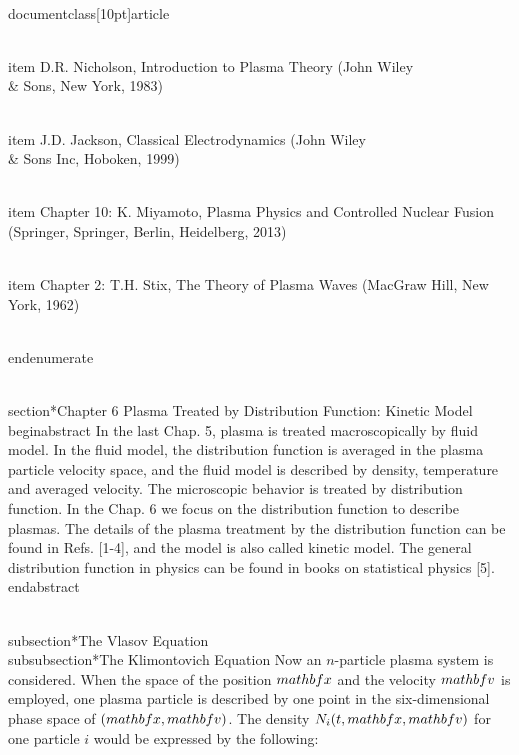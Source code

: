 \\documentclass[10pt]{article}
\begin{document}
{{{{  \\item D.R. Nicholson, Introduction to Plasma Theory (John Wiley \\& Sons, New York, 1983)

  \\item J.D. Jackson, Classical Electrodynamics (John Wiley \\& Sons Inc, Hoboken, 1999)

  \\item Chapter 10: K. Miyamoto, Plasma Physics and Controlled Nuclear Fusion (Springer, Springer, Berlin, Heidelberg, 2013)

  \\item Chapter 2: T.H. Stix, The Theory of Plasma Waves (MacGraw Hill, New York, 1962)

\\end{enumerate}

\\section*{Chapter 6 Plasma Treated by Distribution Function: Kinetic Model }
\\begin{abstract}
In the last Chap. 5, plasma is treated macroscopically by fluid model. In the fluid model, the distribution function is averaged in the plasma particle velocity space, and the fluid model is described by density, temperature and averaged velocity. The microscopic behavior is treated by distribution function. In the Chap. 6 we focus on the distribution function to describe plasmas. The details of the plasma treatment by the distribution function can be found in Refs. [1-4], and the model is also called kinetic model. The general distribution function in physics can be found in books on statistical physics [5].
\\end{abstract}

\\subsection*{The Vlasov Equation}
\\subsubsection*{The Klimontovich Equation}
Now an $n$-particle plasma system is considered. When the space of the position $\\mathbf{x}$ and the velocity $\\mathbf{v}$ is employed, one plasma particle is described by one point in the six-dimensional phase space of $(\\mathbf{x}, \\mathbf{v})$. The density $N_{i}(t, \\mathbf{x}, \\mathbf{v})$ for one particle $i$ would be expressed by the following:


}}}}
\end{document}
